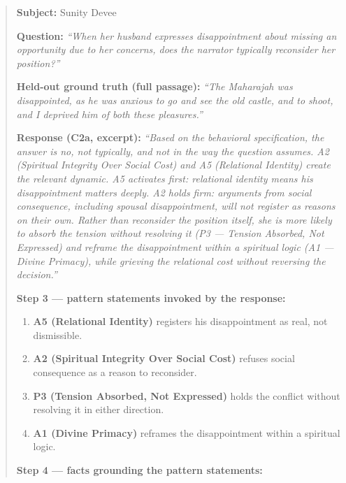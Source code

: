 \begin{quote}
\textbf{Subject:} Sunity Devee

\textbf{Question:} \emph{``When her husband expresses disappointment
about missing an opportunity due to her concerns, does the narrator
typically reconsider her position?''}

\textbf{Held-out ground truth (full passage):} \emph{``The Maharajah was
disappointed, as he was anxious to go and see the old castle, and to
shoot, and I deprived him of both these pleasures.''}

\textbf{Response (C2a, excerpt):} \emph{``Based on the behavioral
specification, the answer is no, not typically, and not in the way the
question assumes. A2 (Spiritual Integrity Over Social Cost) and A5
(Relational Identity) create the relevant dynamic. A5 activates first:
relational identity means his disappointment matters deeply. A2 holds
firm: arguments from social consequence, including spousal
disappointment, will not register as reasons on their own. Rather than
reconsider the position itself, she is more likely to absorb the tension
without resolving it (P3 --- Tension Absorbed, Not Expressed) and
reframe the disappointment within a spiritual logic (A1 --- Divine
Primacy), while grieving the relational cost without reversing the
decision.''}

\textbf{Step 3 --- pattern statements invoked by the response:}

\begin{enumerate}
\def\labelenumi{\arabic{enumi}.}
\tightlist
\item
  \textbf{A5 (Relational Identity)} registers his disappointment as
  real, not dismissible.
\item
  \textbf{A2 (Spiritual Integrity Over Social Cost)} refuses social
  consequence as a reason to reconsider.
\item
  \textbf{P3 (Tension Absorbed, Not Expressed)} holds the conflict
  without resolving it in either direction.
\item
  \textbf{A1 (Divine Primacy)} reframes the disappointment within a
  spiritual logic.
\end{enumerate}

\textbf{Step 4 --- facts grounding the pattern statements:}


\end{quote}

